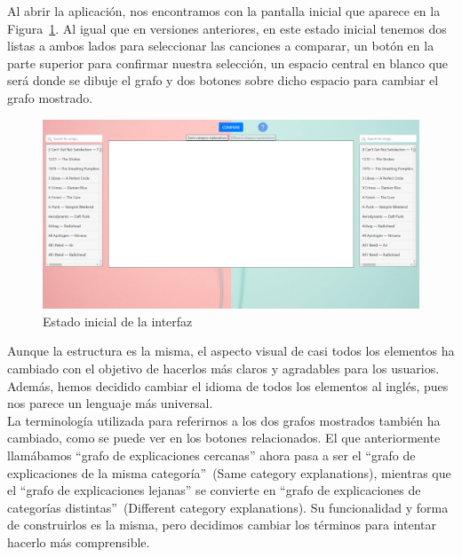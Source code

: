 Al abrir la aplicación, nos encontramos con la pantalla inicial que aparece en la Figura~\ref{fig:estadoInicial}. Al igual que en versiones anteriores, en este estado inicial tenemos dos listas a ambos lados para seleccionar las canciones a comparar, un botón en la parte superior para confirmar nuestra selección, un espacio central en blanco que será donde se dibuje el grafo y dos botones sobre dicho espacio para cambiar el grafo mostrado.\\

\begin{figure}[h!]
	\centering
	\includegraphics[width = 1\textwidth]{Imagenes/Bitmap/Pantalla inicial.png}
	\caption{Estado inicial de la interfaz}
	\label{fig:estadoInicial}
\end{figure}

Aunque la estructura es la misma, el aspecto visual de casi todos los elementos ha cambiado con el objetivo de hacerlos más claros y agradables para los usuarios. Además, hemos decidido cambiar el idioma de todos los elementos al inglés, pues nos parece un lenguaje más universal.\\

La terminología utilizada para referirnos a los dos grafos mostrados también ha cambiado, como se puede ver en los botones relacionados. El que anteriormente llamábamos ``grafo de explicaciones cercanas'' ahora pasa a ser el ``grafo de explicaciones de la misma categoría''~(Same category explanations), mientras que el ``grafo de explicaciones lejanas'' se convierte en ``grafo de explicaciones de categorías distintas''~(Different category explanations). Su funcionalidad y forma de construirlos es la misma, pero decidimos cambiar los términos para intentar hacerlo más comprensible.\\


